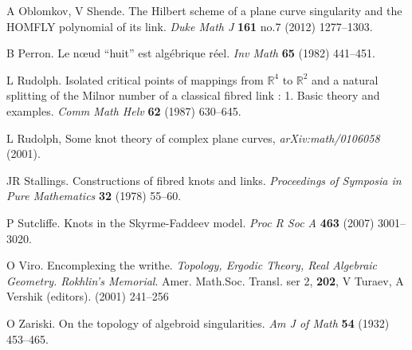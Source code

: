 \documentclass[notitlepage,12pt]{revtex4-1}
\begin{document}
\begin{thebibliography}{99}
 A Oblomkov, V Shende. The Hilbert scheme of a plane curve singularity and the HOMFLY polynomial of its link. \textit{Duke Math J} \textbf{161} no.7 (2012) 1277--1303.

 B Perron. Le n{\oe}ud ``huit'' est alg{\'e}brique r{\'e}el. \textit{Inv Math} \textbf{65} (1982) 441--451.

 L Rudolph. Isolated critical points of mappings from {$\mathbb{R}^{4}$} to {$\mathbb{R}^{2}$} and a natural splitting of the Milnor number of a classical fibred link : 1. Basic theory and examples. \textit{Comm Math Helv} \textbf{62} (1987) 630--645.

 L Rudolph, Some knot theory of complex plane curves, {\it arXiv:math/0106058} (2001).

 JR Stallings. Constructions of fibred knots and links. \textit{Proceedings of Symposia in Pure Mathematics} \textbf{32} (1978) 55--60.

 P Sutcliffe. Knots in the Skyrme-Faddeev model. \textit{Proc R Soc A} \textbf{463} (2007) 3001--3020.

 O Viro. Encomplexing the writhe. \textit{Topology, Ergodic Theory, Real Algebraic Geometry. Rokhlin's Memorial}. Amer. Math.Soc. Transl. ser 2, \textbf{202}, V Turaev, A Vershik (editors). (2001) 241--256

 O Zariski. On the topology of algebroid singularities. \textit{Am J of Math} \textbf{54} (1932) 453--465.

\end{thebibliography}
\end{document}
